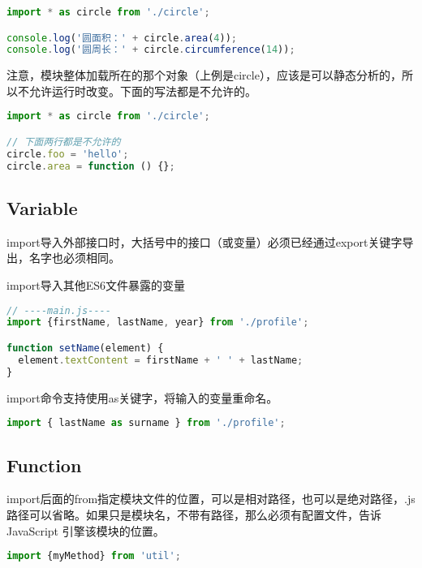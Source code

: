 \begin{lstlisting}[language=JavaScript]
import * as circle from './circle';

console.log('圆面积：' + circle.area(4));
console.log('圆周长：' + circle.circumference(14));
\end{lstlisting}

注意，模块整体加载所在的那个对象（上例是circle），应该是可以静态分析的，所以不允许运行时改变。下面的写法都是不允许的。


\begin{lstlisting}[language=JavaScript]
import * as circle from './circle';

// 下面两行都是不允许的
circle.foo = 'hello';
circle.area = function () {};
\end{lstlisting}




\subsection{Variable}


import导入外部接口时，大括号中的接口（或变量）必须已经通过export关键字导出，名字也必须相同。


\begin{example}
import导入其他ES6文件暴露的变量
\begin{lstlisting}[language=JavaScript]
// ----main.js----
import {firstName, lastName, year} from './profile';

function setName(element) {
  element.textContent = firstName + ' ' + lastName;
}
\end{lstlisting}
\end{example}


import命令支持使用as关键字，将输入的变量重命名。

\begin{lstlisting}[language=JavaScript]
import { lastName as surname } from './profile';
\end{lstlisting}


\subsection{Function}



import后面的from指定模块文件的位置，可以是相对路径，也可以是绝对路径，.js路径可以省略。如果只是模块名，不带有路径，那么必须有配置文件，告诉 JavaScript 引擎该模块的位置。

\begin{lstlisting}[language=JavaScript]
import {myMethod} from 'util';
\end{lstlisting}

